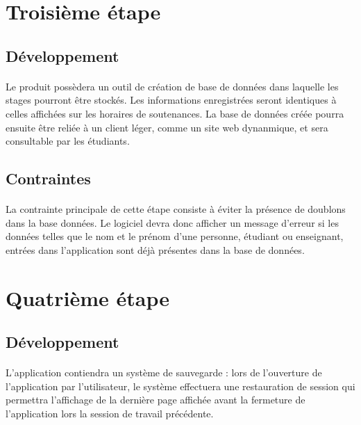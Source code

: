 \documentclass[a4paper,10pt]{report}
\begin{document}
      

    \section{Troisième étape}
      \subsection{Développement}
	\paragraph{}
	Le produit possèdera un outil de création de base de données dans laquelle les stages pourront être stockés. Les informations enregistrées seront identiques à celles affichées sur les horaires de soutenances. 
	La base de données créée pourra ensuite être reliée à un client léger, comme un site web dynanmique, et sera consultable par les étudiants.

      \subsection{Contraintes}
	\paragraph{}
	La contrainte principale de cette étape consiste à éviter la présence de doublons dans la base données. 
	Le logiciel devra donc afficher un message d'erreur si les données telles que le nom et le prénom d'une personne, étudiant ou enseignant, entrées dans l'application sont déjà présentes dans la base de données. 
      
    \section{Quatrième étape}
      \subsection{Développement}
	\paragraph{}
      L’application contiendra un système de sauvegarde : lors de l’ouverture de l’application par l’utilisateur, le système effectuera une restauration de session qui permettra l’affichage de la dernière page affichée avant la fermeture de l’application lors la session de travail précédente.
\end{document}

